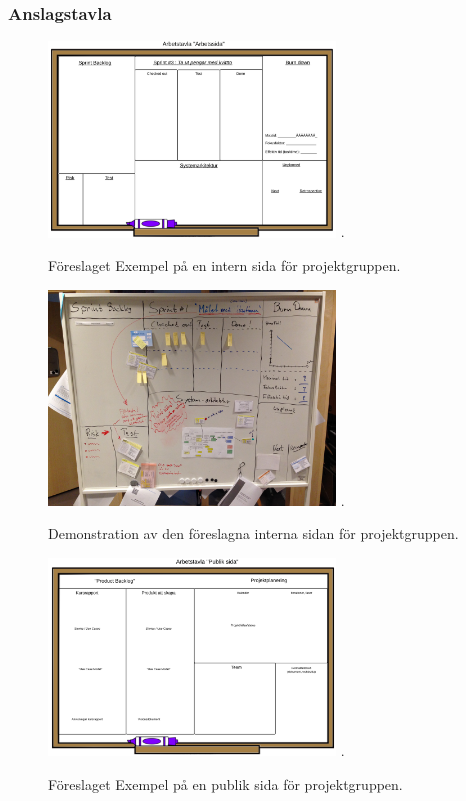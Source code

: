 \documentclass[conference,a4paper]{IEEEtran}
\begin{document}
\subsubsection{Anslagstavla}

\begin{figure}[H]
\centering
\includegraphics[width=3in]{forslagsprintbacklog}
\DeclareGraphicsExtensions.
\caption{Föreslaget Exempel på en intern sida för projektgruppen.}
\label{forslagsprintbacklog}
\end{figure}

\begin{figure}[H]
\centering
\includegraphics[width=3in]{forslagriktigsprint}
\DeclareGraphicsExtensions.
\caption{Demonstration av den föreslagna interna sidan för projektgruppen.}
\label{forslagriktigsprint}
\end{figure}

\begin{figure}[H]
\centering
\includegraphics[width=3in]{forslagproductbacklog}
\DeclareGraphicsExtensions.
\caption{Föreslaget Exempel på en publik sida för projektgruppen.}
\label{forslagproductbacklog}
\end{figure}
\end{document}
